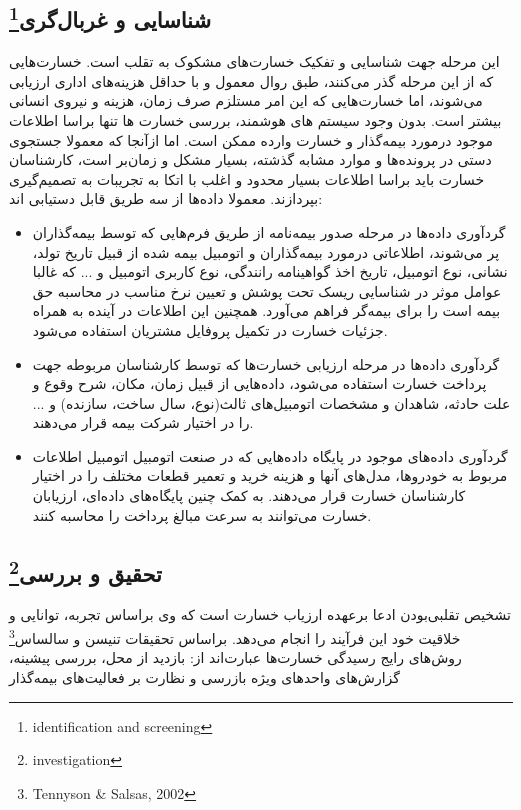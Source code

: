 \documentclass[paper=a4, fontsize=11pt]{article}
\numberwithin{equation}{section} %
\numberwithin{figure}{section} %
\numberwithin{table}{section} %
\begin{document}
\subsection{شناسایی و غربال‌گری\protect\footnote{identification and screening}}
\par
این مرحله جهت شناسایی و تفکیک خسارت‌های مشکوک به تقلب است. خسارت‌هایی که از این مرحله گذر‌ می‌کنند، طبق روال معمول و با حداقل هزینه‌های اداری ارزیابی می‌شوند، اما خسارت‌هایی که این امر مستلزم صرف زمان، هزینه و نیروی انسانی بیشتر است. بدون وجود سیستم های هوشمند، بررسی خسارت ها تنها براسا اطلاعات موجود درمورد بیمه‌گذار و خسارت وارده ممکن است. اما ازآنجا که معمولا جستجوی دستی در پرونده‌ها و موارد مشابه گذشته، بسیار مشکل و زمان‌بر است، کارشناسان خسارت باید براسا اطلاعات بسیار محدود و اغلب با اتکا به تجریبات به تصمیم‌گیری بپردازند.
معمولا داده‌ها از سه طریق قابل دستیابی اند:
\begin{itemize}
    \item
    گردآوری داده‌ها در مرحله صدور بیمه‌نامه از طریق فرم‌هایی که توسط بیمه‌گذاران پر می‌شوند، اطلاعاتی درمورد بیمه‌گذاران و اتومبیل بیمه شده از قبیل تاریخ تولد، نشانی، نوع اتومبیل، تاریخ اخذ گواهینامه رانندگی، نوع کاربری اتومبیل و ... که غالبا عوامل موثر در شناسایی ریسک تحت پوشش و تعیین نرخ مناسب در محاسبه حق‌ بیمه است را برای بیمه‌گر فراهم می‌آورد. همچنین این اطلاعات در آینده به همراه جزئیات خسارت در تکمیل پروفایل مشتریان استفاده می‌شود.
    \item
    گردآوری داده‌ها در مرحله ارزیابی خسارت‌ها که توسط کارشناسان مربوطه جهت پرداخت خسارت استفاده می‌شود، داده‌هایی از قبیل زمان، مکان، شرح وقوع و علت حادثه، شاهدان و مشخصات اتومبیل‌های ثالث(نوع، سال ساخت، سازنده) و ... را در اختیار شرکت بیمه قرار می‌دهند.
    \item
    گردآوری داده‌های موجود در پایگاه داده‌هایی که در صنعت اتومبیل اتومبیل اطلاعات مربوط به خودرو‌ها، مدل‌های آنها و هزینه خرید و تعمیر قطعات مختلف را در اختیار کارشناسان خسارت قرار می‌دهند. به کمک چنین پایگاه‌های داده‌ای، ارزیابان خسارت می‌توانند به سرعت مبالغ پرداخت را محاسبه کنند.
\end{itemize}

\subsection{تحقیق و بررسی\protect\footnote{investigation}}
تشخیص تقلبی‌بودن ادعا برعهده ارزیاب خسارت است که وی براساس تجربه، توانایی و خلاقیت خود این فرآیند را انجام می‌دهد. براساس تحقیقات تنیسن و سالساس\footnote{Tennyson \& Salsas, 2002}
 روش‌های رایج رسیدگی خسارت‌ها عبارت‌اند از: بازدید از محل، بررسی پیشینه، گزارش‌های واحدهای ویژه بازرسی و نظارت بر فعالیت‌های بیمه‌گذار
\end{document}
